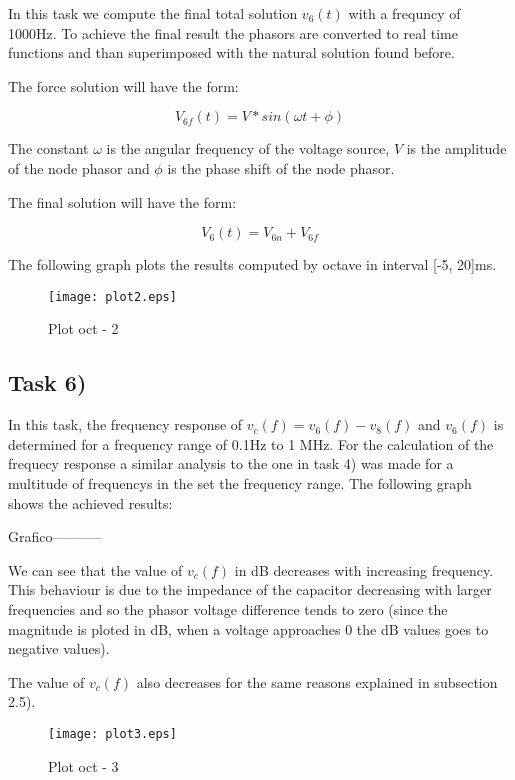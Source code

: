 In this task we compute the final total solution $v_6(t)$ with a frequncy of 1000Hz. To achieve the final result the phasors are converted to real time functions and than superimposed with the natural solution found before.

The force solution will have the form:

\[
V_{6f}(t) = V*sin(\omega t + \phi)
\]

The constant $\omega$ is the angular frequency of the voltage source, $V$ is the amplitude of the node phasor and $\phi$ is the phase shift of the node phasor.

The final solution will have the form:

\[
V_6(t) = V_{6n} + V_{6f}
\]

The following graph plots the results computed by octave in interval [-5, 20]ms.

\begin{figure}[ht]
	\centering
	\texttt{[image: plot2.eps]}
	\caption{Plot oct - 2}
\label{fig:Dsnh_sim_t2}
\end{figure}

\subsection{Task 6)}
\label{subsec:task6_a}

In this task, the frequency response of $v_c(f)= v_6(f) - v_8(f)$ and $v_6(f)$ is determined for a frequency range of 0.1Hz to 1 MHz. For the calculation of the frequecy response a similar analysis to the one in task 4) was made for a multitude of frequencys in the set the frequency range. The following graph shows the achieved results: 


Grafico-----------


We can see that the value of $v_c(f)$ in dB decreases with increasing frequency. This behaviour is due to the impedance of the capacitor decreasing with larger frequencies and so the phasor voltage difference tends to zero (since the magnitude is ploted in dB, when a voltage approaches 0 the dB values goes to negative values).

The value of $v_c(f)$ also decreases for the same reasons explained in subsection 2.5).




\begin{figure}[ht]
	\centering
	\texttt{[image: plot3.eps]}
	\caption{Plot oct - 3}
\label{fig:Dsnh_sim_t2}
\end{figure}



